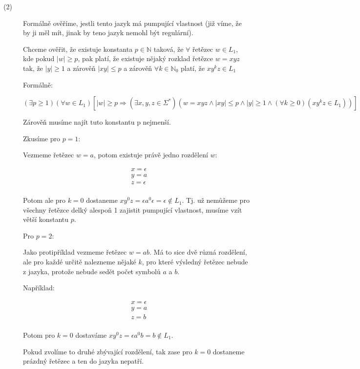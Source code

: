 \documentclass[10pt]{article}
\begin{document}
\begin{description}
\item[(2)]

Formálně ověříme, jestli tento jazyk má pumpující vlastnost (již víme, že by ji měl mít, jinak by teno jazyk nemohl být regulární).

Chceme ověřit, že existuje konstanta $p \in \mathbb{N}$ taková, že $\forall$ řetězec $w \in L_1$, kde pokud $|w| \geq p$, pak platí, že existuje nějaký rozklad řetězce $w = xyz$  tak, že $|y|\geq 1$ a zárověň $|xy| \leq p$ a zárověň $\forall k\in\mathbb{N}_{0}$ platí, že $xy^{k}z \in L_1$

Formálně:

$$(\exists p \geq 1)(\forall w \in L_1)[|w| \geq p \Rightarrow (\exists x, y, z \in \Sigma^{*})(w = xyz \land |xy| \leq p \land |y| \geq 1 \land (\forall k \geq 0)(xy^{k}z \in L_1))] $$

Zárověň musíme najít tuto konstantu p nejmenší.

Zkusíme pro $p = 1$:

Vezmeme řetězec $w = a$, potom existuje právě jedno rozdělení $w$: 

\begin{align*}
& x = \epsilon \\
& y = a \\
& z = \epsilon \\
\end{align*}

Potom ale pro $k = 0$ dostaneme $xy^{0}z = \epsilon a^{0} \epsilon = \epsilon \notin L_1$. Tj. už nemůžeme pro všechny řetězce delký alespoň 1 zajistit pumpující vlastnost, musíme vzít větší konstantu $p$.

Pro $p = 2$:

Jako protipříklad vezmeme řetězec $w = ab$. Má to sice dvě různá rozdělení, ale pro každé určitě nalezneme nějaké $k$,  pro které výsledný řetězec nebude z jazyka, protože nebude sedět počet symbolů $a$ a $b$.

Například:

\begin{align*}
& x = \epsilon \\
& y = a \\
& z = b \\
\end{align*}

Potom pro $k = 0$ dostaváme $xy^{0}z = \epsilon a^{0} b = b \notin L_1$. 

Pokud zvolíme to druhé zbývající rozdělení, tak zase pro $k=0$ dostaneme prázdný řetězec a ten do jazyka nepatří. 


\end{description}
\end{document}

